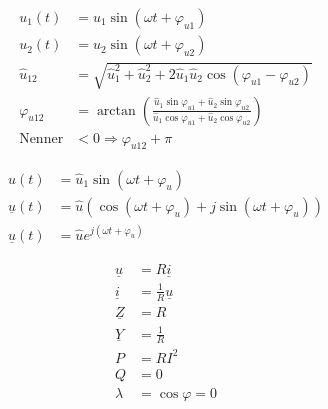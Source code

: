 \begin{boxleft}
\end{boxleft}\begin{boxrightshaded}
\begin{align*}
u_1(t)&=\hat{u}_1\sin{\left(\omega t+\varphi_{u1}\right)}\\
u_2(t)&=\hat{u}_2\sin{\left(\omega t+\varphi_{u2}\right)}\\
\hat{u}_{12}&=\sqrt{\hat{u}_1^2+\hat{u}_2^2+2\hat{u}_1\hat{u}_2\cos\left(\varphi_{u1}-\varphi_{u2}\right)}\\
\varphi_{u12}&=\arctan\left(\frac{\hat{u}_1\sin{\varphi_{u1}}+\hat{u}_2\sin{\varphi_{u2}}}{\hat{u}_1\cos{\varphi_{u1}}+\hat{u}_2\cos{\varphi_{u2}}}\right)\\
\text{Nenner}&<0\Rightarrow\varphi_{u12}+\pi
\end{align*}
\end{boxrightshaded}

\begin{boxleft}
\end{boxleft}\begin{boxrightshaded}
\begin{align*}
u(t)&=\hat{u}_1\sin{\left(\omega t+\varphi_{u}\right)}\\
\underline{u}(t)&=\hat{u}\left(\cos{\left(\omega t+\varphi_{u}\right)}+j\sin{\left(\omega t+\varphi_{u}\right)}\right)\\
\underline{u}(t)&=\hat{u}e^{j\left(\omega t+\varphi_{u}\right)}
\end{align*}
\end{boxrightshaded}

\begin{boxleft}
\end{boxleft}\begin{boxrightshaded}
\begin{align*}
\underline{u}&=R\underline{i}\\
\underline{i}&=\frac{1}{R}\underline{u}\\
\underline{Z}&=R\\
\underline{Y}&=\frac{1}{R}\\
P&=RI^2\\
Q&=0\\
\lambda&=\cos\varphi=0
\end{align*}
\end{boxrightshaded}

